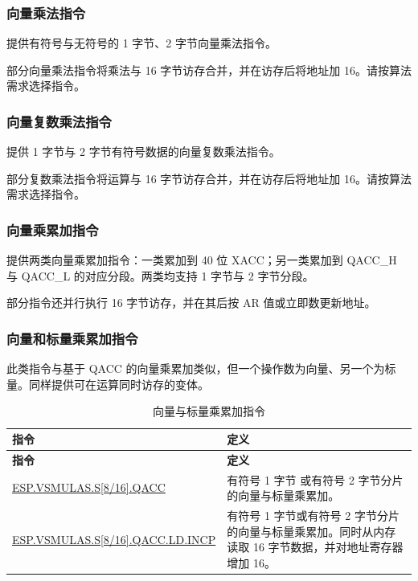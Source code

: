 \documentclass[main\_\_CN.tex]{subfiles}
\begin{document}
\subsubsection{向量乘法指令}

\chipname{} 提供有符号与无符号的 1 字节、2 字节向量乘法指令。

部分向量乘法指令将乘法与 16 字节访存合并，并在访存后将地址加 16。请按算法需求选择指令。




\subsubsection{向量复数乘法指令}

\chipname{} 提供 1 字节与 2 字节有符号数据的向量复数乘法指令。

部分复数乘法指令将运算与 16 字节访存合并，并在访存后将地址加 16。请按算法需求选择指令。




\subsubsection{向量乘累加指令}

\chipname{} 提供两类向量乘累加指令：一类累加到 40 位 XACC；另一类累加到 QACC\_H 与 QACC\_L 的对应分段。两类均支持 1 字节与 2 字节分段。

部分指令还并行执行 16 字节访存，并在其后按 AR 值或立即数更新地址。




\subsubsection{向量和标量乘累加指令}

此类指令与基于 QACC 的向量乘累加类似，但一个操作数为向量、另一个为标量。同样提供可在运算同时访存的变体。

\begin{longtable}[c]{|l|m{10cm}|}
    \caption{向量与标量乘累加指令}
    \label{tab:pie-vector-scalar-instructions}\\
    \hline
    \rowcolor{lightgray}
    \textbf{指令} & \textbf{定义} \\\hline
    \endfirsthead
    \rowcolor{lightgray}
    \textbf{指令} & \textbf{定义} \\\hline
    \endhead
    \endfoot

    \hyperref[instruction:ESPVSMULASS8QACC]{ESP.VSMULAS.S[8/16].QACC} & 有符号 1 字节 或有符号 2 字节分片的向量与标量乘累加。
    \\\hline
    \hyperref[instruction:ESPVSMULASS8QACCLDINCP]{ESP.VSMULAS.S[8/16].QACC.LD.INCP} & 有符号 1 字节或有符号 2 字节分片的向量与标量乘累加。同时从内存读取 16 字节数据，并对地址寄存器增加 16。
    \\\hline
\end{longtable}
\end{document}

